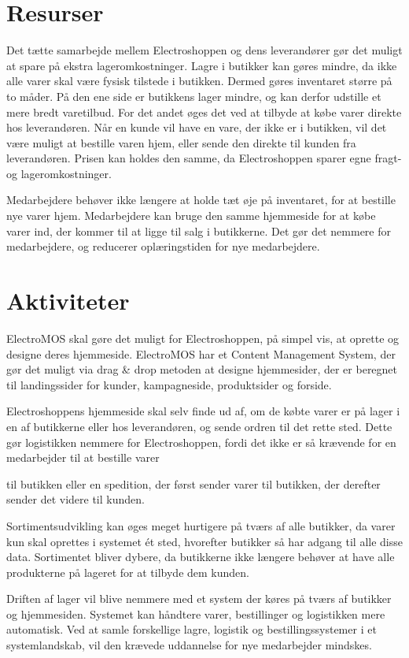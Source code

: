 \section{Resurser}
Det tætte samarbejde mellem Electroshoppen og dens leverandører gør det muligt at spare på ekstra lageromkostninger. Lagre i butikker kan gøres mindre, da ikke alle varer skal være fysisk tilstede i butikken. Dermed gøres inventaret større på to måder. På den ene side er butikkens lager mindre, og kan derfor udstille et mere bredt varetilbud. For det andet øges det ved at tilbyde at købe varer direkte hos leverandøren. Når en kunde vil have en vare, der ikke er i butikken, vil det være muligt at bestille varen hjem, eller sende den direkte til kunden fra leverandøren. Prisen kan holdes den samme, da Electroshoppen sparer egne fragt- og lageromkostninger. 

Medarbejdere behøver ikke længere at holde tæt øje på inventaret, for at bestille nye varer hjem. Medarbejdere kan bruge den samme hjemmeside for at købe varer ind, der kommer til at ligge til salg i butikkerne. Det gør det nemmere for medarbejdere, og reducerer oplæringstiden for nye medarbejdere.

\section{Aktiviteter}
ElectroMOS skal gøre det muligt for Electroshoppen, på simpel vis, at oprette og designe deres hjemmeside. ElectroMOS har et Content Management System, der gør det muligt via drag \& drop metoden at designe hjemmesider, der er beregnet til landingssider for kunder, kampagneside, produktsider og forside. 

Electroshoppens hjemmeside skal selv finde ud af, om de købte varer er på lager i en af butikkerne eller hos leverandøren, og sende ordren til det rette sted. Dette gør logistikken nemmere for Electroshoppen, fordi det ikke er så krævende for en medarbejder til at bestille varer 

til butikken eller en spedition, der først sender varer til butikken, der derefter sender det videre til kunden.

Sortimentsudvikling kan øges meget hurtigere på tværs af alle butikker, da varer kun skal oprettes i systemet ét sted, hvorefter butikker så har adgang til alle disse data. Sortimentet bliver dybere, da butikkerne ikke længere behøver at have alle produkterne på lageret for at tilbyde dem kunden.

Driften af lager vil blive nemmere med et system der køres på tværs af butikker og hjemmesiden. Systemet kan håndtere varer, bestillinger og logistikken mere automatisk. Ved at samle forskellige lagre, logistik og bestillingssystemer i et systemlandskab, vil den krævede uddannelse for nye medarbejder mindskes.

